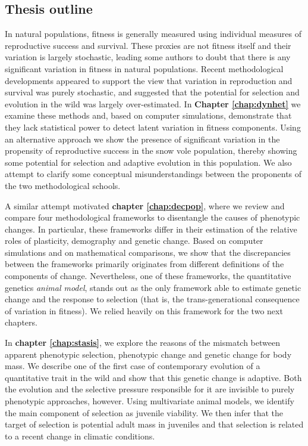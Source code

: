 \subsection{Thesis outline}

In natural populations, fitness is generally measured using individual measures of reproductive success and survival. These proxies are not fitness itself and their variation is largely stochastic, leading some authors to doubt that there is any significant variation in fitness in natural populations. Recent methodological developments appeared to support the view that variation in reproduction and survival was purely stochastic, and suggested that the potential for selection and evolution in the wild was largely over-estimated. In \textbf{Chapter \ref{chap:dynhet}} we examine these methods and, based on computer simulations, demonstrate that they lack statistical power to detect latent variation in fitness components. Using an alternative approach we show the presence of significant variation in the propensity of reproductive success in the snow vole population, thereby showing some potential for selection and adaptive evolution in this population. We also attempt to clarify some conceptual misunderstandings between the proponents of the two methodological schools. 

A similar attempt motivated \textbf{chapter \ref{chap:decpop}}, where we review and compare four methodological frameworks to disentangle the causes of phenotypic changes. In particular, these frameworks differ in their estimation of the relative roles of plasticity, demography and genetic change. Based on computer simulations and on mathematical comparisons, we show that the discrepancies between the frameworks primarily originates from different definitions of the components of change. Nevertheless, one of these frameworks, the quantitative genetics \emph{animal model}, stands out as the only framework able to estimate genetic change and the response to selection (that is, the trans-generational consequence of variation in fitness). We relied heavily on this framework for the two next chapters.  

In \textbf{chapter \ref{chap:stasis}}, we explore the reasons of the mismatch between apparent phenotypic selection, phenotypic change and genetic change for body mass. We describe one of the first case of contemporary evolution of a quantitative trait in the wild and show that this genetic change is adaptive. Both the evolution and the selective pressure responsible for it are invisible to purely phenotypic approaches, however. Using multivariate animal models, we identify the main component of selection as juvenile viability. We then infer that the target of selection is potential adult mass in juveniles and that selection is related to a recent change in climatic conditions. 

